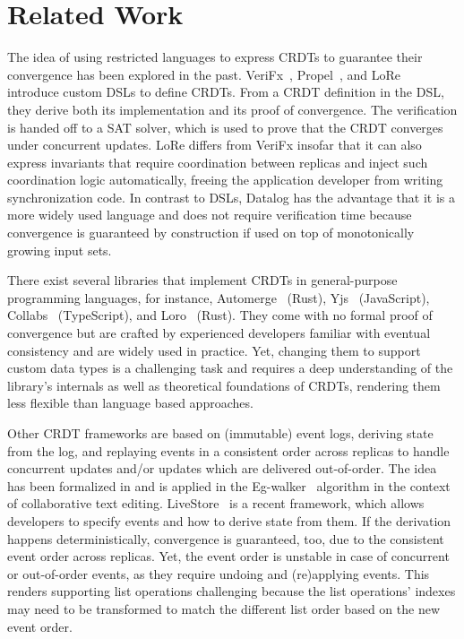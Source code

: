 \section{Related Work}\label{sec:related-work}

The idea of using restricted languages to express \acp{CRDT} to guarantee
their convergence has been explored in the past.
VeriFx~\cite{verifx}, Propel~\cite{propel}, and LoRe~\cite{lore} introduce
custom \acp{DSL} to define \acp{CRDT}.
From a \ac{CRDT} definition in the \ac{DSL},
they derive both its implementation and its proof of convergence.
The verification is handed off to a \acs{SAT} solver, which is used to
prove that the \ac{CRDT} converges under concurrent updates.
LoRe differs from VeriFx insofar that it can also express invariants that
require coordination between replicas and inject such coordination logic
automatically, freeing the application developer from writing synchronization
code.
In contrast to \acp{DSL}, Datalog has the advantage that it is a more widely used
language and does not require verification time because convergence is
guaranteed by construction if used on top of monotonically growing input sets.

There exist several libraries that implement \acp{CRDT} in general-purpose
programming languages, for instance, Automerge~\cite{automerge} (Rust),
Yjs~\cite{yjs} (JavaScript), Collabs~\cite{collabs} (TypeScript),
and Loro~\cite{loro} (Rust).
They come with no formal proof of convergence but are crafted by experienced
developers familiar with eventual consistency and are widely used in practice.
Yet, changing them to support custom data types is a challenging task and
requires a deep understanding of the library's internals as well as theoretical
foundations of \acp{CRDT}, rendering them less flexible than language based
approaches.

Other \ac{CRDT} frameworks are based on (immutable) event logs, deriving state
from the log, and replaying events in a consistent order across replicas to
handle concurrent updates and/or updates which are delivered out-of-order.
The idea has been formalized in \cite{baquero2017pure} and is applied in
the Eg-walker~\cite{egwalker} algorithm in the context of collaborative text
editing.
LiveStore~\cite{livestore} is a recent framework, which allows developers
to specify events and how to derive state from them.
If the derivation happens deterministically, convergence is guaranteed, too,
due to the consistent event order across replicas.
Yet, the event order is unstable in case of concurrent or out-of-order events,
as they require undoing and (re)applying events.
This renders supporting list operations challenging because the list operations'
indexes may need to be transformed to match the different list order based on
the new event order.

